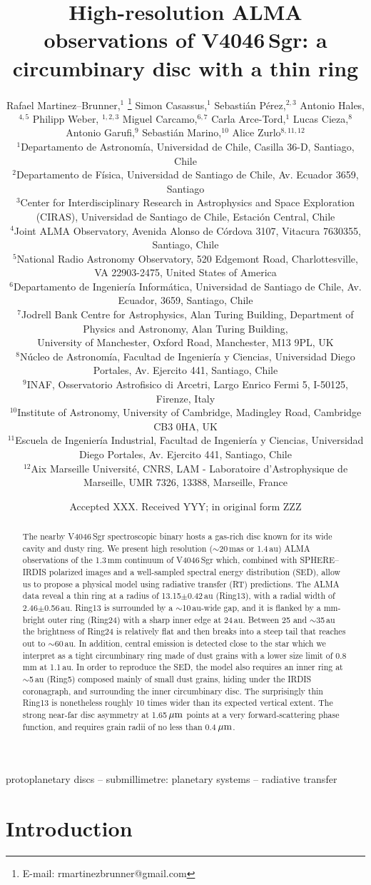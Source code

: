 \documentclass[fleqn,usenatbib,useAMS]{mnras}
\title[High-resolution ALMA observations of V4046\,Sgr]{High-resolution ALMA observations of V4046\,Sgr: a circumbinary disc with a thin ring}
\author[R. Martinez--Brunner et al.]{Rafael Martinez--Brunner,$^{1}$
\thanks{E-mail: rmartinezbrunner@gmail.com}
Simon Casassus,$^{1}$
Sebasti\'an P\'erez,$^{2,3}$
Antonio Hales,$^{4,5}$
Philipp Weber, $^{1,2,3}$ \newauthor
Miguel Carcamo,$^{6,7}$
Carla Arce-Tord,$^{1}$
Lucas Cieza,$^{8}$
Antonio Garufi,$^{9}$
Sebasti\'an Marino,$^{10}$
Alice Zurlo$^{8,11,12}$
\\
$^{1}$Departamento de Astronom\'ia, Universidad de Chile, Casilla 36-D, Santiago, Chile\\
$^{2}$Departamento de F\'isica, Universidad de Santiago de Chile, Av. Ecuador 3659, Santiago\\
$^{3}$Center for Interdisciplinary Research in Astrophysics and Space Exploration (CIRAS), Universidad de Santiago de Chile, Estaci\'on Central, Chile \\
$^{4}$Joint ALMA Observatory, Avenida Alonso de C\'ordova 3107, Vitacura 7630355, Santiago, Chile \\
$^{5}$National Radio Astronomy Observatory, 520 Edgemont Road, Charlottesville, VA 22903-2475, United States of America \\
$^{6}$Departamento de Ingenier\'ia Inform\'atica, Universidad de Santiago de Chile, Av. Ecuador, 3659, Santiago, Chile\\
$^{7}$Jodrell Bank Centre for Astrophysics, Alan Turing Building, Department of Physics and Astronomy, Alan Turing Building,\\ University of Manchester, Oxford Road, Manchester, M13 9PL, UK \\
$^{8}$N\'ucleo de Astronom\'ia, Facultad de Ingenier\'ia y Ciencias, Universidad Diego Portales, Av. Ejercito 441, Santiago, Chile\\
$^{9}$INAF, Osservatorio Astrofisico di Arcetri, Largo Enrico Fermi 5, I-50125, Firenze, Italy\\
$^{10}$Institute of Astronomy, University of Cambridge, Madingley Road, Cambridge CB3 0HA, UK\\
$^{11}$Escuela de Ingenier\'ia Industrial, Facultad de Ingenier\'ia y Ciencias, Universidad Diego Portales, Av. Ejercito 441, Santiago, Chile \\
$^{12}$Aix Marseille Universit\'e, CNRS, LAM - Laboratoire d'Astrophysique de Marseille, UMR 7326, 13388, Marseille, France  \\
}
\date{Accepted XXX. Received YYY; in original form ZZZ}
\begin{document}
\label{firstpage}
\pagerange{\pageref{firstpage}--\pageref{lastpage}}
\maketitle

\begin{abstract}
    The nearby V4046\,Sgr spectroscopic binary hosts a gas-rich disc known for its wide cavity and dusty ring. We present high resolution ($\sim$20\,mas or 1.4\,au) ALMA observations of the 1.3\,mm continuum of V4046\,Sgr which, combined with SPHERE--IRDIS polarized images and a well-sampled spectral energy distribution (SED), allow us to propose a physical model using radiative transfer (RT) predictions. The ALMA data reveal a thin ring at a radius of 13.15$\pm$0.42\,au (Ring13), with a radial width of 2.46$\pm$0.56\,au. Ring13 is surrounded by a $\sim$10\,au-wide gap, and it is flanked by a mm-bright outer ring (Ring24) with a sharp inner edge at 24\,au. Between 25 and $\sim$35\,au the brightness of Ring24 is relatively flat and then breaks into a steep tail that reaches out to $\sim$60\,au. In addition, central emission is detected close to the star which we interpret as a tight circumbinary ring made of dust grains with a lower size limit of 0.8\,mm at 1.1\,au. In order to reproduce the SED, the model also requires an inner ring at $\sim$5\,au (Ring5) composed mainly of small dust grains, hiding under the IRDIS coronagraph, and surrounding the inner circumbinary disc. The surprisingly thin Ring13 is nonetheless roughly 10 times wider than its expected vertical extent. The strong near-far disc asymmetry at 1.65\,$\hbox{$\mu$m}$ points at a very forward-scattering phase function, and requires grain radii of no less than 0.4\,$\hbox{$\mu$m}$.
\end{abstract}

\begin{keywords}
 protoplanetary discs -- submillimetre: planetary systems -- radiative transfer
\end{keywords}



\section{Introduction} \label{sec:Introduction}
\end{document}
